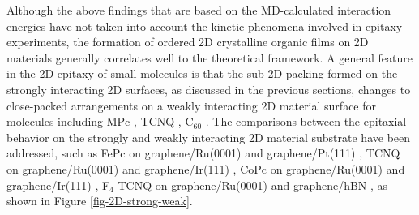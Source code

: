 Although the above findings that are based on the MD-calculated
interaction energies have not taken into account the kinetic phenomena
involved in epitaxy experiments, the formation of ordered 2D
crystalline organic films on 2D materials generally correlates well to
the theoretical framework. A general feature in the 2D epitaxy of
small molecules is that the sub-2D packing formed on the strongly
interacting 2D surfaces, as discussed in the previous sections,
changes to close-packed arrangements on a weakly interacting 2D
material surface for molecules including MPc
\cite{Jarvinen_2013_assembl_SiO2_hBN,Hamalainen_2012_CoPc_gr_Ir,Singha_Roy_2012_CuPc_gr_glass,Xiao_2013_jacs_CuPc_gr,Wu_2013_CuPc_F16_gr,Wang_2010_selec_F16_gr},
TCNQ \cite{Barja_2010_TCNQ_gr}, C\(_{\text{60}}\)
\cite{Jung_2014_C60_gr_Cu,Kim_2015_c60_gr,Chen_2016_c60_mos2}. The
comparisons between the epitaxial behavior on the strongly and weakly
interacting 2D material substrate have been addressed, such as FePc on
graphene/Ru(0001) and graphene/Pt(111) \cite{Yang_2012_MPc_gr_metal},
TCNQ on graphene/Ru(0001) \cite{Maccariello_2014_TCNQ_gr_Ru} and
graphene/Ir(111) \cite{Barja_2010_TCNQ_gr}, CoPc on graphene/Ru(0001)
\cite{Cai_2015_CoPc_gr_Ru} and graphene/Ir(111)
\cite{Hamalainen_2012_CoPc_gr_Ir}, F\(_{\text{4}}\)-TCNQ on graphene/Ru(0001)
\cite{Stradi_2014_TCNQ_gr_Ru} and graphene/hBN
\cite{Tsai_2015_TCNQ_gr_hbn}, as shown in Figure
\ref{fig-2D-strong-weak}.

